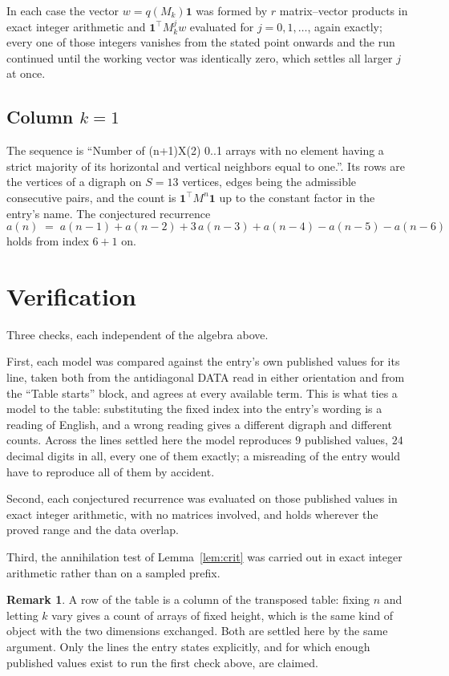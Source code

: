 \documentclass[11pt,a4paper]{article}
\theoremstyle{plain}
\theoremstyle{definition}
\newtheorem{remark}[theorem]{Remark}
\begin{document}
In each case the vector $w=q(M_k)\mathbf{1}$ was formed by $r$ matrix--vector products in
exact integer arithmetic and $\mathbf{1}^{\!\top}M_k^{j}w$ evaluated for $j=0,1,\dots$,
again exactly; every one of those integers vanishes from the stated point onwards and the run
continued until the working vector was identically zero, which settles all larger $j$ at once.

\subsection*{Column $k$$=1$}
The sequence is ``Number of (n+1)X(2) 0..1 arrays with no element having a strict majority of its horizontal and vertical neighbors equal to one.''. Its rows are the vertices of a digraph on
$S=13$ vertices, edges being the admissible consecutive pairs, and the count is
$\mathbf{1}^{\!\top}M^{n}\mathbf{1}$ up to the constant factor in the entry's name.
The conjectured recurrence
\[
a(n)\;=\;a(n-1) + a(n-2) + 3\,a(n-3) + a(n-4) - a(n-5) - a(n-6)
\]
holds from index $6+1$ on.

\section{Verification}

Three checks, each independent of the algebra above.

First, each model was compared against the entry's own published values for its line, taken
both from the antidiagonal DATA read in either orientation and from the ``Table starts''
block, and agrees at every available term. This is what ties a model to the table:
substituting the fixed index into the entry's wording is a reading of English, and a wrong
reading gives a different digraph and different counts. Across the lines settled here the
model reproduces $9$ published values, $24$ decimal digits in all, every one of
them exactly; a misreading of the entry would have to reproduce all of them by accident.

Second, each conjectured recurrence was evaluated on those published values in exact
integer arithmetic, with no matrices involved, and holds wherever the proved range and the
data overlap.

Third, the annihilation test of Lemma~\ref{lem:crit} was carried out in exact integer
arithmetic rather than on a sampled prefix.

\begin{remark}
A row of the table is a column of the transposed table: fixing $n$ and letting $k$ vary gives a
count of arrays of fixed height, which is the same kind of object with the two dimensions
exchanged. Both are settled here by the same argument. Only the lines the entry states
explicitly, and for which enough published values exist to run the first check above, are
claimed.
\end{remark}
\end{document}
